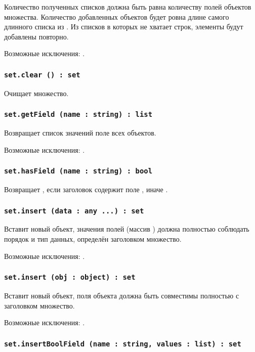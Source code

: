 Количество полученных списков должна быть равна количеству полей объектов множества. Количество добавленных объектов будет ровна длине самого длинного списка из . Из списков в которых не хватает строк, элементы будут добавлены повторно.

Возможные исключения: .

\subsubsection{\lstinline|set.clear () : set|}

Очищает множество.

\subsubsection{\lstinline|set.getField (name : string) : list|}

Возвращает список значений поле  всех объектов.

Возможные исключения: .

\subsubsection{\lstinline|set.hasField (name : string) : bool|}

Возвращает \true, если заголовок содержит поле , иначе \false.

\subsubsection{\lstinline|set.insert (data : any ...) : set|}

Вставит новый объект, значения полей (массив ) должна полностью соблюдать порядок и тип данных, определён заголовком множество.

Возможные исключения: .

\subsubsection{\lstinline|set.insert (obj : object) : set|}

Вставит новый объект, поля объекта  должна быть совместимы полностью с заголовком множество.

Возможные исключения: .

\subsubsection{\lstinline|set.insertBoolField (name : string, values : list) : set|}

